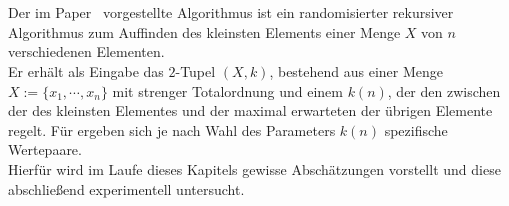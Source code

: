\section{\Rm}	%


\noindent
Der im Paper~\cite{meyer1} vorgestellte Algorithmus \Rm ist ein randomisierter rekursiver Algorithmus zum Auffinden des kleinsten Elements einer Menge $X$ von $n$ verschiedenen Elementen.\\[.05cm]
Er erhält als Eingabe das $2$-Tupel $(X, k)$, bestehend aus einer Menge $X:=\{x_1,\cdots,x_n\}$ mit strenger Totalordnung und einem \tuning $k(n)$, der den \trade zwischen der \fg \fgm des kleinsten Elementes und der maximal erwarteten \fg \fgr der übrigen Elemente regelt. Für \fgpair ergeben sich je nach Wahl des Parameters $k(n)$ spezifische Wertepaare.\\[0.05cm]
Hierfür wird im Laufe dieses Kapitels gewisse Abschätzungen vorstellt und diese abschließend experimentell untersucht.


